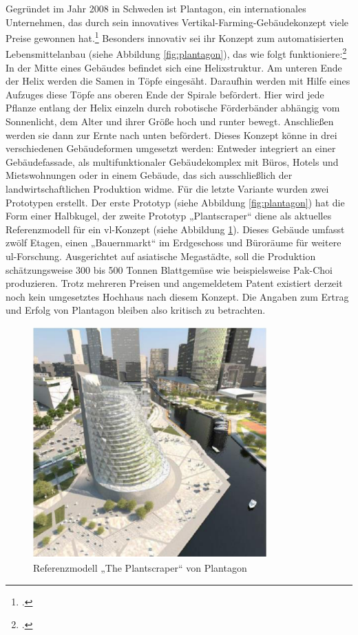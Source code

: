 \documentclass{scrartcl}
\begin{document}
Gegründet im Jahr 2008 in Schweden ist Plantagon, ein internationales Unternehmen, das durch sein innovatives Vertikal-Farming-Gebäudekonzept viele Preise gewonnen hat.\footcite[Vgl.]{PlantagonAwardsPlantagon} Besonders innovativ sei ihr Konzept zum automatisierten Lebensmittelanbau (siehe Abbildung \ref{fig:plantagon}), das wie folgt funktioniere:\footcite[Vgl.][S.21f]{Al-Kodmany2018TheCity}  In der Mitte eines Gebäudes befindet sich eine Helixstruktur. Am unteren Ende der Helix werden die Samen in Töpfe eingesäht. Daraufhin werden mit Hilfe eines Aufzuges diese Töpfe ans oberen Ende der Spirale befördert. Hier wird jede Pflanze entlang der Helix einzeln durch robotische Förderbänder abhängig vom Sonnenlicht, dem Alter und ihrer Größe hoch und runter bewegt. Anschließen werden sie dann zur Ernte nach unten befördert. Dieses Konzept könne in drei verschiedenen Gebäudeformen umgesetzt werden: Entweder integriert an einer Gebäudefassade, als multifunktionaler Gebäudekomplex mit Büros, Hotels und Mietswohnungen oder in einem Gebäude, das sich ausschließlich der landwirtschaftlichen Produktion widme. Für die letzte Variante wurden zwei Prototypen erstellt. Der erste Prototyp (siehe Abbildung \ref{fig:plantagon}) hat die Form einer Halbkugel, der zweite Prototyp „Plantscraper“ diene als aktuelles Referenzmodell für ein \acs{vl}-Konzept (siehe Abbildung \ref{fig:plantagon_2}). Dieses Gebäude umfasst zwölf Etagen, einen „Bauernmarkt“ im Erdgeschoss und Büroräume für weitere \acs{ul}-Forschung. Ausgerichtet auf asiatische Megastädte, soll die Produktion schätzungsweise 300 bis 500 Tonnen Blattgemüse wie beispielsweise Pak-Choi produzieren. Trotz mehreren Preisen und angemeldetem Patent existiert derzeit noch kein umgesetztes Hochhaus nach diesem Konzept. Die Angaben zum Ertrag und Erfolg von Plantagon bleiben also kritisch zu betrachten.

\begin{figure}[htbp]
    \centering
    \includegraphics[width=9cm]{image_folder/plantscraper.png}
  \caption{Referenzmodell „The Plantscraper“ von Plantagon}
  \label{fig:plantagon_2}
\end{figure} 
\end{document}
